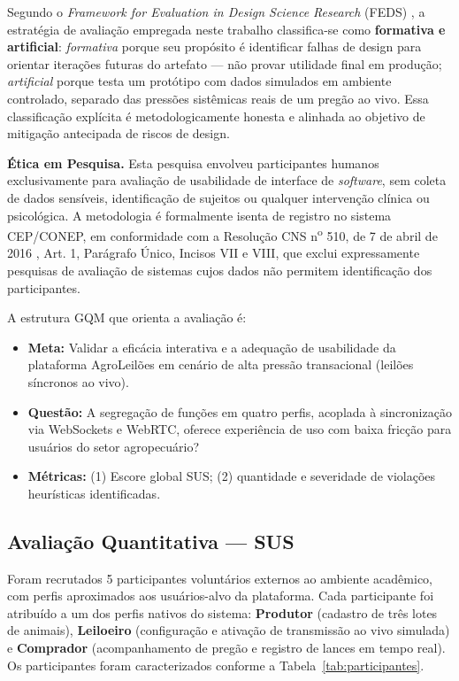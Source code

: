 \documentclass[12pt]{article}
\begin{document}
Segundo o \textit{Framework for Evaluation in Design Science Research} (FEDS)
\cite{venable2012}, a estratégia de avaliação empregada neste trabalho classifica-se
como \textbf{formativa e artificial}: \textit{formativa} porque seu propósito é
identificar falhas de design para orientar iterações futuras do artefato --- não provar
utilidade final em produção; \textit{artificial} porque testa um protótipo com dados
simulados em ambiente controlado, separado das pressões sistêmicas reais de um pregão ao
vivo. Essa classificação explícita é metodologicamente honesta e alinhada ao objetivo de
mitigação antecipada de riscos de design.

\textbf{Ética em Pesquisa.} Esta pesquisa envolveu participantes humanos exclusivamente
para avaliação de usabilidade de interface de \textit{software}, sem coleta de dados
sensíveis, identificação de sujeitos ou qualquer intervenção clínica ou psicológica. A
metodologia é formalmente isenta de registro no sistema CEP/CONEP, em conformidade com
a Resolução CNS n\textsuperscript{o} 510, de 7 de abril de 2016 \cite{cns2016}, Art. 1,
Parágrafo Único, Incisos VII e VIII, que exclui expressamente pesquisas de avaliação de
sistemas cujos dados não permitem identificação dos participantes.

A estrutura GQM que orienta a avaliação é:

\begin{itemize}
  \item \textbf{Meta:} Validar a eficácia interativa e a adequação de usabilidade da
    plataforma AgroLeilões em cenário de alta pressão transacional (leilões síncronos
    ao vivo).
  \item \textbf{Questão:} A segregação de funções em quatro perfis, acoplada à
    sincronização via WebSockets e WebRTC, oferece experiência de uso com baixa fricção
    para usuários do setor agropecuário?
  \item \textbf{Métricas:} (1) Escore global SUS; (2) quantidade e severidade de
    violações heurísticas identificadas.
\end{itemize}

\subsection{Avaliação Quantitativa --- SUS}

Foram recrutados 5 participantes voluntários externos ao ambiente acadêmico, com
perfis aproximados aos usuários-alvo da plataforma. Cada participante foi atribuído a
um dos perfis nativos do sistema: \textbf{Produtor} (cadastro de três lotes de animais),
\textbf{Leiloeiro} (configuração e ativação de transmissão ao vivo simulada) e
\textbf{Comprador} (acompanhamento de pregão e registro de lances em tempo real).
Os participantes foram caracterizados conforme a Tabela~\ref{tab:participantes}.
\end{document}

